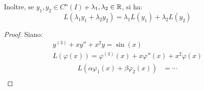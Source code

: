 Inoltre, se \(y_1, y_2 \in C^n(I)\) e \(\lambda_1, \lambda_2 \in \mathbb{R} \), si ha:
\[
    L(\lambda_1 y_1 + \lambda_2 y_2) = \lambda_1 L(y_1) + \lambda_2 L(y_2)
\]

\begin{proof}
    Siano:
    \begin{align*}
        y^{(3)} + xy'' + x^2y = \sin(x) \\
        L(\varphi(x)) = \varphi^{(3)}(x) + x\varphi''(x) + x^2\varphi(x)
    \end{align*}
    \begin{align*}
        L(\alpha\varphi_1(x) + \beta\varphi_2(x)) & = \cdots \\
    \end{align*}
\end{proof}
